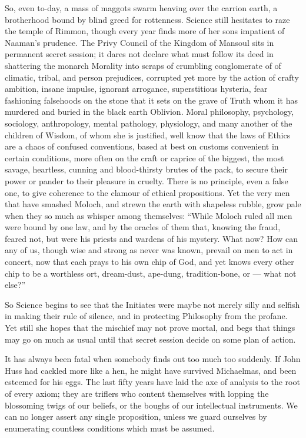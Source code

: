 So, even to-day, a mass of maggots swarm heaving over the carrion earth, a brotherhood bound by blind greed for rottenness. Science still hesitates to raze the temple of Rimmon, though every year finds more of her sons impatient of Naaman's prudence. The Privy Council of the Kingdom of Mansoul sits in permanent secret session; it dares not declare what must follow its deed in shattering the monarch Morality into scraps of crumbling conglomerate of of climatic, tribal, and person prejudices, corrupted yet more by the action of crafty ambition, insane impulse, ignorant arrogance, superstitious hysteria, fear fashioning falsehoods on the stone that it sets on the grave of Truth whom it has murdered and buried in the black earth Oblivion. Moral philosophy, psychology, sociology, anthropology, mental pathology, physiology, and many another of the children of Wisdom, of whom she is justified, well know that the laws of Ethics are a chaos of confused conventions, based at best on customs convenient in certain conditions, more often on the craft or caprice of the biggest, the most savage, heartless, cunning and blood-thirsty brutes of the pack, to secure their power or pander to their pleasure in cruelty. There is no principle, even a false one, to give coherence to the clamour of ethical propositions. Yet the very men that have smashed Moloch, and strewn the earth with shapeless rubble, grow pale when they so much as whisper among themselves: \enquote{While Moloch ruled all men were bound by one law, and by the oracles of them that, knowing the fraud, feared not, but were his priests and wardens of his mystery. What now? How can any of us, though wise and strong as never was known, prevail on men to act in concert, now that each prays to his own chip of God, and yet knows every other chip to be a worthless ort, dream-dust, ape-dung, tradition-bone, or --- what not else?}

So Science begins to see that the Initiates were maybe not merely silly and selfish in making their rule of silence, and in protecting Philosophy from the profane. Yet still she hopes that the mischief may not prove mortal, and begs that things may go on much as usual until that secret session decide on some plan of action.

It has always been fatal when somebody finds out too much too suddenly. If John Huss had cackled more like a hen, he might have survived Michaelmas, and been esteemed for his eggs. The last fifty years have laid the axe of analysis to the root of every axiom; they are triflers who content themselves with lopping the blossoming twigs of our beliefs, or the boughs of our intellectual instruments. We can no longer assert any single proposition, unless we guard ourselves by enumerating countless conditions which must be assumed.

